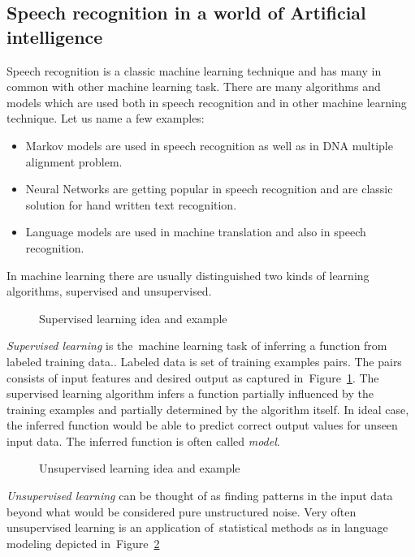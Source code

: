 \subsection*{Speech recognition in a world of Artificial intelligence}
\label{sub:intro_ml}
Speech recognition is a classic machine learning technique and has many in common with other machine learning task. 
There are many algorithms and models which are used both in speech recognition and in other machine learning technique.
Let us name a few examples:
\begin{itemize}
    \item Markov models are used in speech recognition as well as in \ac{DNA} multiple alignment problem.
    \item Neural Networks are getting popular in speech recognition and are classic solution for hand written text recognition.
    \item Language models are used in machine translation and also in speech recognition. 
\end{itemize}

In machine learning there are usually distinguished two kinds of learning algorithms, supervised and unsupervised.

\begin{figure}[!htp]
    \begin{center}
    
    
    \caption{Supervised learning idea and example}
    \label{fig:supervised} 
    \end{center}
\end{figure}
{\it Supervised learning}\/ is the~machine learning task of inferring a function from labeled training data.\cite{mohri2012foundations}. Labeled data is set of training examples pairs. The pairs consists of input features and desired output as captured in~Figure~\ref{fig:supervised}. The supervised learning algorithm infers a function partially influenced by the training examples and partially determined by the algorithm itself. In ideal case, the inferred function would be able to predict correct output values for unseen input data. 
The inferred function is often called {\it model}. 

\begin{figure}[!htp]
    \begin{center}
    
    
    \caption{Unsupervised learning idea and example}
    \label{fig:unsupervised} 
    \end{center}
\end{figure}
{\it Unsupervised learning}\/ can be thought of as finding patterns in the input data beyond what would be considered 
pure unstructured noise\cite{ghahramani2004unsupervised}. Very often unsupervised learning is an application 
of~statistical methods as in language modeling depicted in~Figure~\ref{fig:unsupervised}

